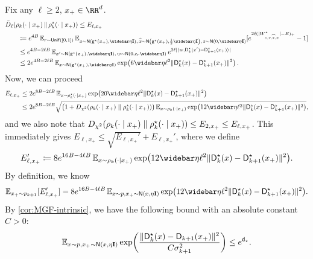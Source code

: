 \subsection{}

Fix any $\ell\geq 2$, $x_+\in\RR^d$.
\begin{align*}
    &\Dsys[\ell]{\rho_k(\cdot\mid x_+)}{\rhostar_k(\cdot\mid x_+)}
    \leq E_{\ell,x_+} \\
    &\qquad \deq e^{4B}\En_{r\sim \unif([0,1])} \En_{x\sim \normal{\gds(x_+),\etabar\Id},\, \xhat\sim \normal{\gds(x_+),\frac12\etabar\Id},\,z\sim \Netabar}[e^{2\ell(\abs{\Wstar_{z,r,\xhat,x}}-B)_+}-1] \\
    &\qquad \leq e^{4B-2\ell B} \En_{x'\sim \normal{\gds(x_+),\etabar\Id},\, w\sim \normal{0, c_r\etabar\Id}} e^{2\ell \abs{\tri{w,\Ds_k(x')-\Ds_{k+1}(x_+)}}} \\
    &\qquad \leq 2e^{4B-2\ell B} \En_{x\sim \normal{\gds(x_+),\etabar\Id}}\exp\prn*{ 6\etabar\ell^2 \nrm{\Ds_k(x)-\Ds_{k+1}(x_+)}^2}\,.
\end{align*}
Now, we can proceed
\begin{align*}
    E_{\ell,x_+}
    \leq&~  2e^{8B-2\ell B} \En_{x\sim \rhostar_k(\cdot\mid x_+)}\exp\prn*{ 20\etabar\ell^2 \nrm{\Ds_k(x)-\Ds_{k+1}(x_+)}^2} \\
    \leq&~ 2e^{8B-2\ell B} \sqrt{\prn*{1+\Dchis{\rho_k(\cdot\mid x_+)}{\rhostar_k(\cdot\mid x_+)}} \En_{x\sim \rho_k(\cdot\mid x_+)}\exp\prn*{ 12\etabar\ell^2 \nrm{\Ds_k(x)-\Ds_{k+1}(x_+)}^2}},
\end{align*}
and we also note that $\Dchis{\rho_k(\cdot\mid x_+)}{\rhostar_k(\cdot\mid x_+)}\leq E_{2,x_+}\leq E_{\ell,x_+}$. This immediately gives $E_{\ell,x_+}\leq \sqrt{E_{\ell,x_+}'}+E_{\ell,x_+}'$, where we define
\begin{align*}
    E_{\ell,x_+}'\deq 8e^{16B-4\ell B}\En_{x\sim \rho_k(\cdot\mid x_+)}\exp\prn*{ 12\etabar\ell^2 \nrm{\Ds_k(x)-\Ds_{k+1}(x_+)}^2}.
\end{align*}
By definition, we know
\begin{align*}
    \En_{x_+\sim p_{k+1}}[E_{\ell, x_+}']
    =8e^{16B-4\ell B}\En_{x\sim p, x_+\sim \normal{x,\eta\Id}}\exp\prn*{ 12\etabar\ell^2 \nrm{\Ds_k(x)-\Ds_{k+1}(x_+)}^2}.
\end{align*}
By \cref{cor:MGF-intrinsic}, we have the following bound with an absolute constant $C>0$:
\begin{align*}
    \En_{x\sim p, x_+\sim \normal{x,\eta\Id}} \exp\prn*{ \frac{\nrm{\Ds_k(x)-\Dn_{k+1}(x_+)}^2}{C\sigma_{k+1}^2} }
    \leq e^{\dbar}.
\end{align*}
